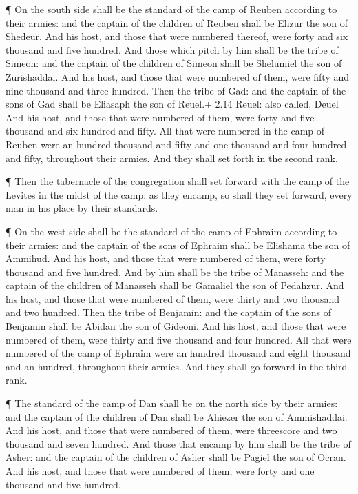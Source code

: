  ¶ On the south side shall be the standard of the camp of
Reuben according to their armies: and the captain of the children of
Reuben shall be Elizur the son of Shedeur.  And his host,
and those that were numbered thereof, were forty and six thousand and
five hundred.  And those which pitch by him shall be the
tribe of Simeon: and the captain of the children of Simeon shall be
Shelumiel the son of Zurishaddai.  And his host, and those
that were numbered of them, were fifty and nine thousand and three
hundred.  Then the tribe of Gad: and the captain of the
sons of Gad shall be Eliasaph the son of Reuel.+ 2.14 Reuel: also
called, Deuel  And his host, and those that were numbered
of them, were forty and five thousand and six hundred and fifty.
 All that were numbered in the camp of Reuben were an
hundred thousand and fifty and one thousand and four hundred and fifty,
throughout their armies. And they shall set forth in the second rank.

 ¶ Then the tabernacle of the congregation shall set
forward with the camp of the Levites in the midst of the camp: as they
encamp, so shall they set forward, every man in his place by their
standards.

 ¶ On the west side shall be the standard of the camp of
Ephraim according to their armies: and the captain of the sons of
Ephraim shall be Elishama the son of Ammihud.  And his
host, and those that were numbered of them, were forty thousand and five
hundred.  And by him shall be the tribe of Manasseh: and
the captain of the children of Manasseh shall be Gamaliel the son of
Pedahzur.  And his host, and those that were numbered of
them, were thirty and two thousand and two hundred.  Then
the tribe of Benjamin: and the captain of the sons of Benjamin shall be
Abidan the son of Gideoni.  And his host, and those that
were numbered of them, were thirty and five thousand and four hundred.
 All that were numbered of the camp of Ephraim were an
hundred thousand and eight thousand and an hundred, throughout their
armies. And they shall go forward in the third rank.

 ¶ The standard of the camp of Dan shall be on the north
side by their armies: and the captain of the children of Dan shall be
Ahiezer the son of Ammishaddai.  And his host, and those
that were numbered of them, were threescore and two thousand and seven
hundred.  And those that encamp by him shall be the tribe
of Asher: and the captain of the children of Asher shall be Pagiel the
son of Ocran.  And his host, and those that were numbered
of them, were forty and one thousand and five hundred.

